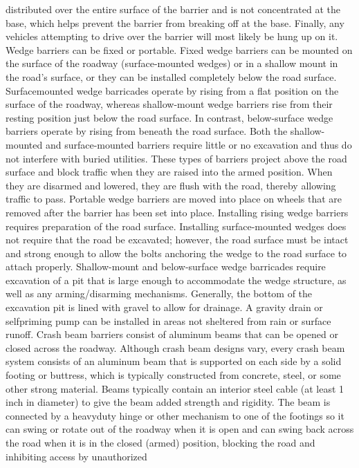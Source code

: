 \documentclass{article}
\begin{document}
distributed over the entire surface of the barrier and is not
concentrated at the base, which helps prevent the barrier from breaking
off at the base. Finally, any vehicles attempting to drive over the
barrier will most likely be hung up on it. Wedge barriers can be fixed
or portable. Fixed wedge barriers can be mounted on the surface of the
roadway (surface-mounted wedges) or in a shallow mount in the road's
surface, or they can be installed completely below the road surface.
Surfacemounted wedge barricades operate by rising from a flat position
on the surface of the roadway, whereas shallow-mount wedge barriers rise
from their resting position just below the road surface. In contrast,
below-surface wedge barriers operate by rising from beneath the road
surface. Both the shallow-mounted and surface-mounted barriers require
little or no excavation and thus do not interfere with buried utilities.
These types of barriers project above the road surface and block traffic
when they are raised into the armed position. When they are disarmed and
lowered, they are flush with the road, thereby allowing traffic to pass.
Portable wedge barriers are moved into place on wheels that are removed
after the barrier has been set into place. Installing rising wedge
barriers requires preparation of the road surface. Installing
surface-mounted wedges does not require that the road be excavated;
however, the road surface must be intact and strong enough to allow the
bolts anchoring the wedge to the road surface to attach properly.
Shallow-mount and below-surface wedge barricades require excavation of a
pit that is large enough to accommodate the wedge structure, as well as
any arming/disarming mechanisms. Generally, the bottom of the excavation
pit is lined with gravel to allow for drainage. A gravity drain or
selfpriming pump can be installed in areas not sheltered from rain or
surface runoff. Crash beam barriers consist of aluminum beams that can
be opened or closed across the roadway. Although crash beam designs
vary, every crash beam system consists of an aluminum beam that is
supported on each side by a solid footing or buttress, which is
typically constructed from concrete, steel, or some other strong
material. Beams typically contain an interior steel cable (at least 1
inch in diameter) to give the beam added strength and rigidity. The beam
is connected by a heavyduty hinge or other mechanism to one of the
footings so it can swing or rotate out of the roadway when it is open
and can swing back across the road when it is in the closed (armed)
position, blocking the road and inhibiting access by unauthorized
\end{document}
